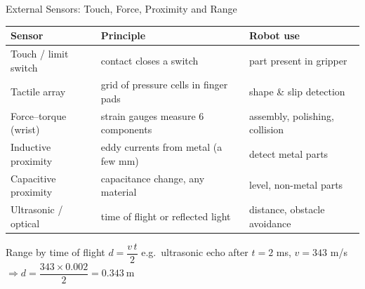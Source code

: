 \documentclass[aspectratio=169]{beamer}
\begin{document}
	\begin{frame}{External Sensors: Touch, Force, Proximity and Range}
		\renewcommand{\arraystretch}{1.1}
		\centering
		\footnotesize
		\begin{tabular}{@{}>{\raggedright}p{2.8cm}>{\raggedright}p{5.0cm}>{\raggedright\arraybackslash}p{4.6cm}@{}}
			\toprule
			\textbf{Sensor} & \textbf{Principle} & \textbf{Robot use} \\
			\midrule
			Touch / limit switch & contact closes a switch               & part present in gripper \\
			Tactile array        & grid of pressure cells in finger pads  & shape \& slip detection \\
			Force--torque (wrist) & strain gauges measure 6 components    & assembly, polishing, collision \\
			Inductive proximity  & eddy currents from metal (a few mm)   & detect metal parts \\
			Capacitive proximity & capacitance change, any material     & level, non-metal parts \\
			Ultrasonic / optical & time of flight or reflected light     & distance, obstacle avoidance \\
			\bottomrule
		\end{tabular}
		\vspace{0.15cm}
		\begin{block}{Range by time of flight}
			\small $d = \dfrac{v\,t}{2}$ \quad e.g.\ ultrasonic echo after $t = 2$ ms, $v = 343$ m/s $\Rightarrow d = \dfrac{343\times0.002}{2} = \boxed{0.343\ \text{m}}$
		\end{block}
	\end{frame}
\end{document}
